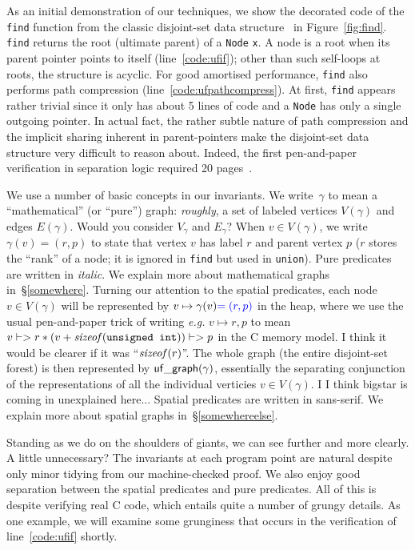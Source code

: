 

As an initial demonstration of our techniques, we show the decorated code of the 
\texttt{find} function from the classic disjoint-set data structure~\cite{CLRS} in 
Figure~\ref{fig:find}. \texttt{find} returns the root 
(ultimate parent) of a \texttt{Node} \texttt{x}. A node is a root when its parent 
pointer points to itself (line~\ref{code:ufif}); 
other than such self-loops at roots, the structure is acyclic. 
For good amortised performance, \texttt{find} also performs path 
compression (line~\ref{code:ufpathcompress}).
At first, \texttt{find} appears rather trivial since it only has about 5 lines 
of code and a \texttt{Node} has only a single outgoing pointer.  
In actual fact, the rather subtle nature of path compression and the 
implicit sharing inherent in parent-pointers make the disjoint-set data 
structure very difficult to reason about. Indeed, the first pen-and-paper 
verification in separation logic required 20 pages~\cite{neelthesis}.

We use a number of basic concepts in our invariants.  We write~$\gamma$ to 
mean a ``mathematical'' (or ``pure'') graph: \emph{roughly}, a set of 
labeled vertices {\color{magenta}$V(\gamma)$ and edges $E(\gamma)$.} 
{\color{blue} Would you consider $V_\gamma$ and $E_\gamma$?}   
When $v \in V(\gamma)$, we write $\gamma(v) = (r,p)$ to state that vertex $v$ has 
label $r$ and parent vertex $p$ ($r$ stores the ``rank'' of a node; it is ignored 
in \texttt{find} but used in \texttt{union}).  Pure predicates are written in 
\textit{italic}.  We explain more about mathematical graphs in~\S\ref{somewhere}. 
Turning our attention to the spatial predicates, each node $v \in V(\gamma)$ will be 
represented by $v \mapsto \gamma(v) {\color{blue} = (r,p)}$ in the heap, 
where we use the usual pen-and-paper 
trick of writing \emph{e.g.} $v \mapsto r,p$ to mean 
\mbox{$v |-> r * (v + \mathit{sizeof}(\texttt{unsigned int})) |-> p$} in the C memory model.
{\color{blue}I think it would be clearer if it was ``$\mathit{sizeof}(r)$''.}
The whole graph (the entire disjoint-set forest) is then represented by 
$\mathsf{uf\_graph}(\gamma)$, {\color{magenta}essentially the 
separating conjunction of} the representations 
of all the individual verticies $v \in V(\gamma)$. 
{\color{blue}I I think bigstar is coming in unexplained here...}
Spatial predicates are written 
in \textsf{sans-serif}.  We explain more about spatial graphs in~\S\ref{somewhereelse}.

{\color{magenta}Standing as we do on the shoulders of giants, we can see 
further and more clearly.} {\color{blue} A little unnecessary?} The invariants at 
each program point are natural despite only minor tidying from our machine-checked 
proof.  We also enjoy good separation between the spatial predicates and pure 
predicates.  All of this is despite verifying real C code, which entails quite a number 
of grungy details. As one example, we will examine some grunginess that occurs in the 
verification of line~\ref{code:ufif} shortly.

